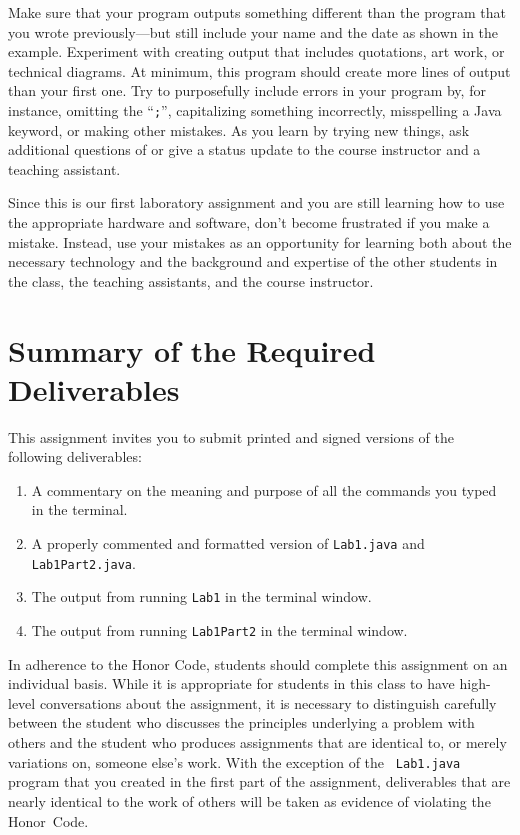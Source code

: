\documentclass[11pt]{article}
\begin{document}
Make sure that your program outputs something different than the program that you wrote previously---but still include
your name and the date as shown in the example. Experiment with creating output that includes quotations, art work, or
technical diagrams.  At minimum, this program should create more lines of output than your first one. Try to
purposefully include errors in your program by, for instance, omitting the ``{\tt ;}'', capitalizing something
incorrectly, misspelling a Java keyword, or making other mistakes. As you learn by trying new things, ask additional
questions of or give a status update to the course instructor and a teaching assistant.

Since this is our first laboratory assignment and you are still learning how to use the appropriate hardware and
software, don't become frustrated if you make a mistake. Instead, use your mistakes as an opportunity for learning both
about the necessary technology and the background and expertise of the other students in the class, the teaching
assistants, and the course instructor.

\section*{Summary of the Required Deliverables}

This assignment invites you to submit printed and signed versions of the following deliverables:

\vspace*{-.1in}
\begin{enumerate}
  \setlength{\itemsep}{0in}
  \item A commentary on the meaning and purpose of all the commands you typed in the terminal.
  \item A properly commented and formatted version of {\tt Lab1.java} and {\tt Lab1Part2.java}.
  \item The output from running {\tt Lab1} in the terminal window.
  \item The output from running {\tt Lab1Part2} in the terminal window.
\end{enumerate}
\vspace*{-.1in}

In adherence to the Honor Code, students should complete this assignment on an individual basis. While it is appropriate
for students in this class to have high-level conversations about the assignment, it is necessary to distinguish
carefully between the student who discusses the principles underlying a problem with others and the student who produces
assignments that are identical to, or merely variations on, someone else's work.  With the exception of the {\tt
Lab1.java} program that you created in the first part of the assignment, deliverables that are nearly identical to the
work of others will be taken as evidence of violating the \mbox{Honor Code}.


\end{document}
